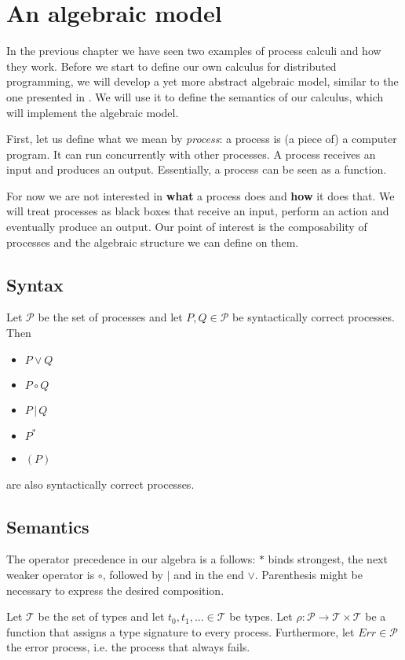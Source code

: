 \chapter{An algebraic model}
In the previous chapter we have seen two examples of process calculi and how they work. Before we start to define our own calculus for distributed programming, we will develop a yet more abstract algebraic model, similar to the one presented in \cite{Hoare:2012:LPU:2368298.2368301}. We will use it to define the semantics of our calculus, which will implement the algebraic model.

First, let us define what we mean by \textit{process}: a process is (a piece of) a computer program. It can run concurrently with other processes. A process receives an input and produces an output. Essentially, a process can be seen as a function. %

For now we are not interested in \textbf{what} a process does and \textbf{how} it does that. We will treat processes as black boxes that receive an input, perform an action and eventually produce an output. Our point of interest is the composability of processes and the algebraic structure we can define on them.

\section{Syntax}

Let $\mathcal{P}$ be the set of processes and let $P, Q \in \mathcal{P}$ be syntactically correct processes. Then
\begin{itemize}
  \item $P \vee Q$
  \item $P \circ Q$
  \item $P \,|\, Q$
  \item $P^*$
  \item $\left( P \right)$
\end{itemize}
are also syntactically correct processes.

\section{Semantics}
The operator precedence in our algebra is a follows: $*$ binds strongest, the next weaker operator is $\circ$, followed by $|$ and in the end $\vee$. Parenthesis might be necessary to express the desired composition.

Let $\mathcal{T}$ be the set of types and let $t_0, t_1, \ldots \in \mathcal{T}$ be types. Let $\rho \colon \mathcal{P} \to \mathcal{T} \times \mathcal{T}$ be a function that assigns a type signature to every process. Furthermore, let $Err \in \mathcal{P}$ the error process, i.e. the process that always fails.

